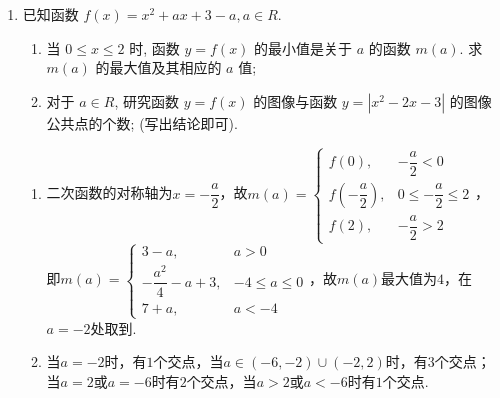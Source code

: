 \begin{enumerate}
\item 已知函数 $f(x)=x^2+a x+3-a, a \in R$.
\begin{enumerate}
    \item 当 $0 \leq x \leq 2$ 时, 函数 $y=f(x)$ 的最小值是关于 $a$ 的函数 $m(a)$. 求 $m(a)$ 的最大值及其相应的 $a$ 值;
    \item 对于 $a \in R$, 研究函数 $y=f(x)$ 的图像与函数 $y=\left|x^2-2 x-3\right|$ 的图像公共点的个数; (写出结论即可).
\end{enumerate}
\begin{jieda}
    \begin{enumerate}
        \item 二次函数的对称轴为$x = -\dfrac{a}{2}$，故$m(a) = \left \{ \begin{array}{ll}
            f(0), & -\dfrac{a}{2} < 0 \\
            f( -\dfrac{a}{2}), & 0 \leq -\dfrac{a}{2} \leq 2 \\
            f(2), & -\dfrac{a}{2} > 2
        \end{array}\right.$，\\
        即$m(a) = \left \{ \begin{array}{ll}
            3-a, & a > 0 \\
            -\dfrac{a^2}{4}-a+3, & -4 \leq a \leq 0 \\
            7+a, & a < -4
        \end{array}\right.$，故$m(a)$最大值为$4$，在$a = -2$处取到.
        \item 当$a = -2$时，有$1$个交点，当$a \in (-6, -2)\cup(-2, 2)$时，有$3$个交点；当$a = 2$或$a = -6$时有$2$个交点，当$a > 2$或$a < -6$时有$1$个交点.
    \end{enumerate}
\end{jieda}
\begin{vspace_}
    \vsp[3]
\end{vspace_}


\end{enumerate}
